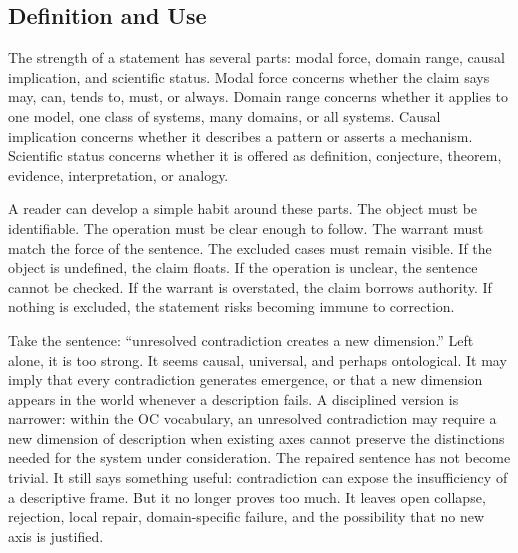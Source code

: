 \documentclass[11pt,a4paper,openany]{book}
\begin{document}
\subsection{Definition and Use}
The strength of a statement has several parts: modal force, domain range, causal implication, and scientific status. Modal force concerns whether the claim says may, can, tends to, must, or always. Domain range concerns whether it applies to one model, one class of systems, many domains, or all systems. Causal implication concerns whether it describes a pattern or asserts a mechanism. Scientific status concerns whether it is offered as definition, conjecture, theorem, evidence, interpretation, or analogy. \cite{grimmett_percolation,goldenfeld_lectures}\par
A reader can develop a simple habit around these parts. The object must be identifiable. The operation must be clear enough to follow. The warrant must match the force of the sentence. The excluded cases must remain visible. If the object is undefined, the claim floats. If the operation is unclear, the sentence cannot be checked. If the warrant is overstated, the claim borrows authority. If nothing is excluded, the statement risks becoming immune to correction.\par
Take the sentence: ``unresolved contradiction creates a new dimension.'' Left alone, it is too strong. It seems causal, universal, and perhaps ontological. It may imply that every contradiction generates emergence, or that a new dimension appears in the world whenever a description fails. A disciplined version is narrower: within the OC vocabulary, an unresolved contradiction may require a new dimension of description when existing axes cannot preserve the distinctions needed for the system under consideration. The repaired sentence has not become trivial. It still says something useful: contradiction can expose the insufficiency of a descriptive frame. But it no longer proves too much. It leaves open collapse, rejection, local repair, domain-specific failure, and the possibility that no new axis is justified.\par
\end{document}
